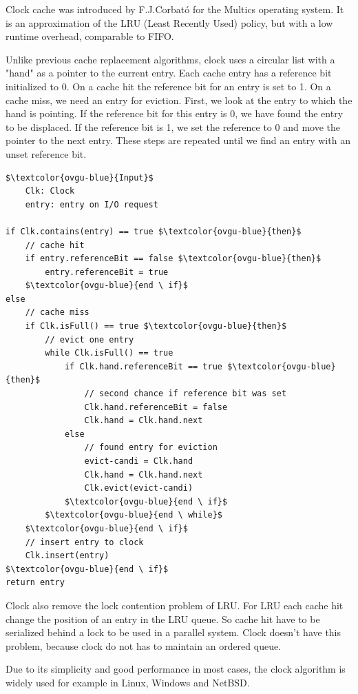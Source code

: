 \documentclass[
	12pt,
	a4paper,
	abstract,
	bibliography=totoc,
	chapterprefix,
	headings=openright,
	numbers=endperiod,
	parskip=half,
	twoside,
]{scrreprt}
\begin{document}
Clock cache was introduced by F.J.Corbató \cite{corbato1968paging} for the Multics operating system.
It is an approximation of the LRU (Least Recently Used) policy, but with a low runtime overhead, comparable to FIFO.

Unlike previous cache replacement algorithms, clock uses a circular list with a "hand" as a pointer to the current entry.
Each cache entry has a reference bit initialized to 0.
On a cache hit the reference bit for an entry is set to 1.
On a cache miss, we need an entry for eviction.
First, we look at the entry to which the hand is pointing. If the reference bit for this entry is 0, we have found the entry to be displaced.
If the reference bit is 1, we set the reference to 0 and move the pointer to the next entry.
These steps are repeated until we find an entry with an unset reference bit.

\newpage
\begin{lstlisting}[mathescape=true,caption=Clock replacement algorithm in pseudocode,label=lst:clock-algorithm]
$\textcolor{ovgu-blue}{Input}$
	Clk: Clock
	entry: entry on I/O request

if Clk.contains(entry) == true $\textcolor{ovgu-blue}{then}$
	// cache hit
	if entry.referenceBit == false $\textcolor{ovgu-blue}{then}$
		entry.referenceBit = true
	$\textcolor{ovgu-blue}{end \ if}$
else
	// cache miss
	if Clk.isFull() == true $\textcolor{ovgu-blue}{then}$
		// evict one entry
		while Clk.isFull() == true
			if Clk.hand.referenceBit == true $\textcolor{ovgu-blue}{then}$
				// second chance if reference bit was set
				Clk.hand.referenceBit = false
				Clk.hand = Clk.hand.next
			else
				// found entry for eviction 
				evict-candi = Clk.hand
				Clk.hand = Clk.hand.next
				Clk.evict(evict-candi)
			$\textcolor{ovgu-blue}{end \ if}$
		$\textcolor{ovgu-blue}{end \ while}$
	$\textcolor{ovgu-blue}{end \ if}$
	// insert entry to clock
	Clk.insert(entry)
$\textcolor{ovgu-blue}{end \ if}$	
return entry 
\end{lstlisting}

Clock also remove the lock contention problem of LRU.
For LRU each cache hit change the position of an entry in the LRU queue.
So cache hit have to be serialized behind a lock to be used in a parallel system.
Clock doesn't have this problem, because clock do not has to maintain an ordered queue.

Due to its simplicity and good performance in most cases, the clock algorithm is widely used for example in Linux, Windows and NetBSD.
\end{document}

